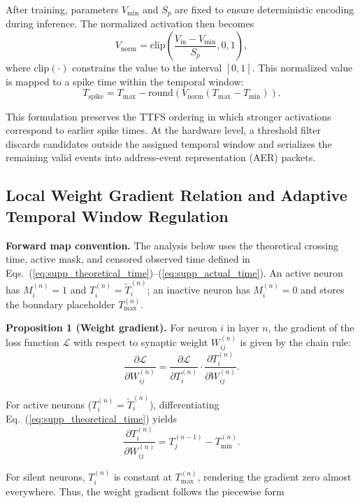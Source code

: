 \documentclass[12pt]{article}
\begin{document}
After training, parameters $V_{\min}$ and $S_p$ are fixed to ensure deterministic encoding during inference. The normalized activation then becomes
\begin{equation}
V_{\mathrm{norm}} = \mathrm{clip}\left(\frac{V_{\mathrm{in}}-V_{\min}}{S_p},0,1\right),
\end{equation}
where $\mathrm{clip}(\cdot)$ constrains the value to the interval $[0,1]$. This normalized value is mapped to a spike time within the temporal window:
\begin{equation}
T_{\mathrm{spike}} = T_{\max}-\mathrm{round}\left(V_{\mathrm{norm}}(T_{\max}-T_{\min})\right).
\end{equation}

This formulation preserves the TTFS ordering in which stronger activations correspond to earlier spike times. At the hardware level, a threshold filter discards candidates outside the assigned temporal window and serializes the remaining valid events into address-event representation (AER) packets.

\subsection{Local Weight Gradient Relation and Adaptive Temporal Window Regulation}

\textbf{Forward map convention.}
 The analysis below uses the theoretical crossing time, active mask, and censored observed time defined in Eqs.~(\ref{eq:supp_theoretical_time})--(\ref{eq:supp_actual_time}). An active neuron has $M_i^{(n)}=1$ and $T_i^{(n)}=\tilde{T}_i^{(n)}$; an inactive neuron has $M_i^{(n)}=0$ and stores the boundary placeholder $T_{\max}^{(n)}$.

\textbf{Proposition 1 (Weight gradient).}
For neuron $i$ in layer $n$, the gradient of the loss function $\mathcal{L}$ with respect to synaptic weight $W_{ij}^{(n)}$ is given by the chain rule:
 \begin{equation}
\frac{\partial \mathcal{L}}{\partial W_{ij}^{(n)}} =
\frac{\partial \mathcal{L}}{\partial T_i^{(n)}}
\cdot
\frac{\partial T_i^{(n)}}{\partial W_{ij}^{(n)}}.
\label{eq:supp_chain_rule}
\end{equation}

For active neurons ($T_i^{(n)}=\tilde{T}_i^{(n)}$), differentiating Eq.~(\ref{eq:supp_theoretical_time}) yields
\[
\frac{\partial T_i^{(n)}}{\partial W_{ij}^{(n)}} =
T_j^{(n-1)} - T_{\min}^{(n)}.
\]

For silent neurons, $T_i^{(n)}$ is constant at $T_{\max}^{(n)}$, rendering the gradient zero almost everywhere. Thus, the weight gradient follows the piecewise form
\end{document}
